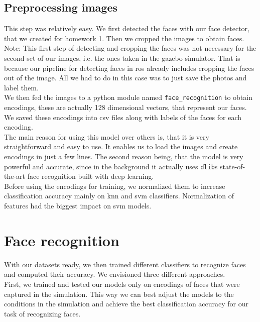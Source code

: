 \documentclass[12pt,a4paper]{article}
\begin{document}
    \subsection{Preprocessing images}

    This step was relatively easy. We first detected the faces with our face detector, that we created for homework 1. Then we cropped the images to obtain faces. \\

    Note: This first step of detecting and cropping the faces was not necessary for the second set of our images, i.e. the ones taken in the gazebo simulator. That is because our pipeline for detecting faces in ros already includes cropping the faces out of the image. All we had to do in this case was to just save the photos and label them. \\

    We then fed the images to a python module named \texttt{face\_recognition} to obtain encodings, these are actually 128 dimensional vectors, that represent our faces. We saved these encodings into csv files along with labels of the faces for each encoding. \\

    The main reason for using this model over others is, that it is very straightforward and easy to use. It enables us to load the images and create encodings in just a few lines. The second reason being, that the model is very powerful and accurate, since in the background it actually uses \texttt{dlib}s state-of-the-art face recognition built with deep learning. \\

    Before using the encodings for training, we normalized them to increase classification accuracy mainly on knn and svm classifiers. Normalization of features had the biggest impact on svm models. \\

    \section{Face recognition}

    With our datasets ready, we then trained different classifiers to recognize faces and computed their accuracy. We envisioned three different approaches. \\

    First, we trained and tested our models only on encodings of faces that were captured in the simulation. This way we can best adjust the models to the conditions in the simulation and achieve the best classification accuracy for our task of recognizing faces. \\
\end{document}
